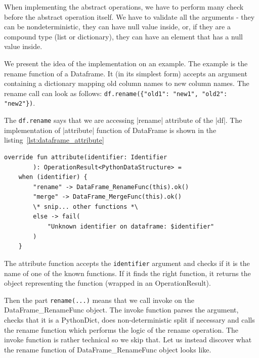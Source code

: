 When implementing the abstract operations, we have to perform many check before the abstract operation itself.
We have to validate all the arguments - they can be nondeterministic, they can have null value inside, or, if they are
a compound type (list or dictionary), they can have an element that has a null value inside.

We present the idea of the implementation on an example.
The example is the rename function of a Dataframe.
It (in its simplest form) accepts an argument containing a dictionary mapping old column names to new column names.
The rename call can look as follows: \verb|df.rename({"old1": "new1", "old2": "new2"})|.

The \verb|df.rename| says that we are accessing |rename| attribute of the |df|.
The implementation of |attribute| function of DataFrame is shown in the listing~\ref{lst:dataframe_attribute}

\begin{lstlisting}[caption=Snippet of attribute function of Dataframe, label={lst:dataframe_attribute}, captionpos=b]
override fun attribute(identifier: Identifier
        ): OperationResult<PythonDataStructure> =
    when (identifier) {
        "rename" -> DataFrame_RenameFunc(this).ok()
        "merge" -> DataFrame_MergeFunc(this).ok()
        \* snip... other functions *\
        else -> fail(
            "Unknown identifier on dataframe: $identifier"
        )
    }
\end{lstlisting}

The attribute function accepts the \verb|identifier| argument and checks if it is the name of one of the known functions.
If it finds the right function, it returns the object representing the function (wrapped in an OperationResult).

Then the part \verb|rename(...)| means that we call invoke on the \\ DataFrame\_RenameFunc object.
The invoke function parses the argument, checks that it is a PythonDict, does non-deterministic split if necessary and
calls the rename function which performs the logic of the rename operation.
The invoke function is rather technical so we skip that.
Let us instead discover what the rename function of DataFrame\_RenameFunc object looks like.

